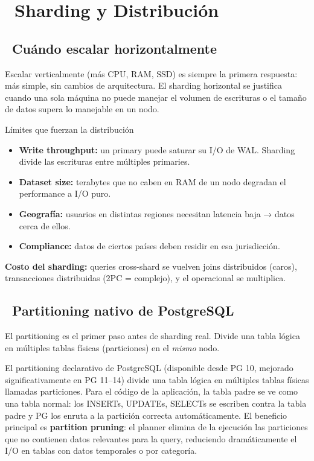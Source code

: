 \chapter[Sharding y Distribución]{~Sharding y Distribución}

\section[Cuándo escalar horizontalmente]{~Cuándo escalar horizontalmente}

Escalar verticalmente (más CPU, RAM, SSD) es siempre la primera respuesta: más simple, sin cambios de arquitectura.
El sharding horizontal se justifica cuando una sola máquina no puede manejar el volumen de escrituras o el tamaño de datos supera lo manejable en un nodo.

\begin{teoriabox}{Límites que fuerzan la distribución}
\begin{itemize}
  \item \textbf{Write throughput:} un primary puede saturar su I/O de WAL. Sharding divide las escrituras entre múltiples primaries.
  \item \textbf{Dataset size:} terabytes que no caben en RAM de un nodo degradan el performance a I/O puro.
  \item \textbf{Geografía:} usuarios en distintas regiones necesitan latencia baja → datos cerca de ellos.
  \item \textbf{Compliance:} datos de ciertos países deben residir en esa jurisdicción.
\end{itemize}
\textbf{Costo del sharding:} queries cross-shard se vuelven joins distribuidos (caros), transacciones distribuidas (2PC = complejo), y el operacional se multiplica.
\end{teoriabox}

\section[Partitioning nativo de PostgreSQL]{~Partitioning nativo de PostgreSQL}

El partitioning es el primer paso antes de sharding real. Divide una tabla lógica en múltiples tablas físicas (particiones) en el \emph{mismo} nodo.

El partitioning declarativo de PostgreSQL (disponible desde PG 10, mejorado significativamente en PG 11--14) divide una tabla lógica en múltiples tablas físicas llamadas particiones.
Para el código de la aplicación, la tabla padre se ve como una tabla normal: los INSERTs, UPDATEs, SELECTs se escriben contra la tabla padre y PG los enruta a la partición correcta automáticamente.
El beneficio principal es \textbf{partition pruning}: el planner elimina de la ejecución las particiones que no contienen datos relevantes para la query, reduciendo dramáticamente el I/O en tablas con datos temporales o por categoría.

